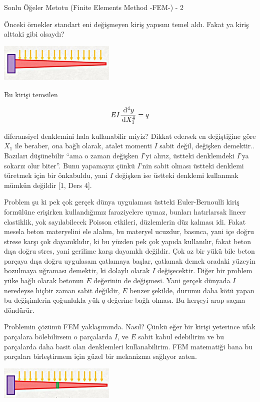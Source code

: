 \documentclass[12pt,fleqn]{article}\usepackage{../../common}
\begin{document}
Sonlu Öğeler Metotu (Finite Elements Method -FEM-) - 2

Önceki örnekler standart eni değişmeyen kiriş yapısını temel aldı.  Fakat ya
kiriş alttaki gibi olsaydı?

\includegraphics[width=15em]{compscieng_bpp45fem2_01.jpg}

Bu kirişi temsilen

$$
E I \frac{\,\mathrm{d}^4 y}{\,\mathrm{d} X_1^4} = q
$$

diferansiyel denklemini hala kullanabilir miyiz? Dikkat edersek en değiştiğine
göre $X_1$ ile beraber, ona bağlı olarak, atalet momenti $I$ sabit değil,
değişken demektir.. Bazıları düşünebilir ``ama o zaman değişken $I$'yi alırız,
üstteki denklemdeki $I$'ya sokarız olur biter''. Bunu yapamayız çünkü $I$'nin
sabit olması üstteki denklemi türetmek için bir önkabuldu, yani $I$ değişken ise
üstteki denklemi kullanmak mümkün değildir [1, Ders 4].

Problem şu ki pek çok gerçek dünya uygulaması üstteki Euler-Bernoulli kiriş
formülüne erişirken kullandığımız faraziyelere uymaz, bunları hatırlarsak lineer
elastiklik, yok sayılabilecek Poisson etkileri, düzlemlerin düz kalması idi.
Fakat mesela beton materyelini ele alalım, bu materyel ucuzdur, basınca, yani
içe doğru strese karşı çok dayanıklıdır, ki bu yüzden pek çok yapıda kullanılır,
fakat beton dışa doğru stres, yani gerilime karşı dayanıklı değildir. Çok az bir
yükü bile beton parçaya dışa doğru uygulasam çatlamaya başlar, çatlamak demek
oradaki yüzeyin bozulmaya uğraması demektir, ki dolaylı olarak $I$
değişecektir. Diğer bir problem yüke bağlı olarak betonun $E$ değerinin de
değişmesi. Yani gerçek dünyada $I$ neredeyse hiçbir zaman sabit değildir, $E$
benzer şekilde, durumu daha kötü yapan bu değişimlerin çoğunlukla yük $q$
değerine bağlı olması. Bu herşeyi arap saçına döndürür.

Problemin çözümü FEM yaklaşımında. Nasıl? Çünkü eğer bir kirişi yeterince ufak
parçalara bölebilirsem o parçalarda $I$, ve $E$ sabit kabul edebilirim ve bu
parçalarda daha basit olan denklemleri kullanabilirim. FEM matematiği bana bu
parçaları birleştirmem için güzel bir mekanizma sağlıyor zaten.

\includegraphics[width=15em]{compscieng_bpp45fem2_02.jpg}
\end{document}
